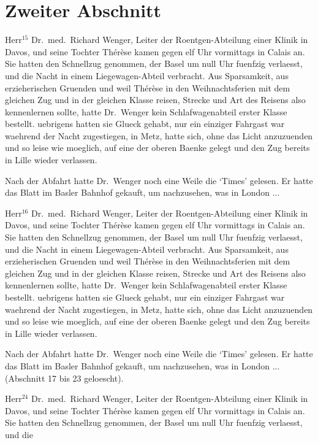 \section{Zweiter Abschnitt}
Herr$^{15}$ Dr.~med.~Richard Wenger, Leiter der Roent\-gen-Ab\-tei\-lung
einer Klinik in Davos, und seine
Tochter Th\'e\-r\`ese kamen gegen elf Uhr vormittags
in Calais an. Sie hatten den Schnellzug genommen,
der Basel um null Uhr fuenfzig verlaesst, und die
Nacht in einem Liege\-wagen-Abteil verbracht.
Aus Sparsamkeit, aus erzieherischen
Gruenden und weil
Th\'e\-r\`ese in den Weihnachtsferien mit dem gleichen
Zug und in der gleichen Klasse reisen, Strecke und
Art des Reisens also kennenlernen sollte, hatte Dr.~Wenger
kein Schlafwagenabteil erster Klasse bestellt.
uebrigens hatten sie Glueck gehabt, nur ein
einziger Fahrgast war waehrend der Nacht zugestiegen,
in Metz, hatte sich, ohne das Licht anzuzuenden
und so leise wie moeglich, auf eine der oberen
Baenke gelegt und den Zug bereits in Lille wieder
verlassen.\par
Nach der Abfahrt hatte Dr.~Wen\-ger noch eine
Weile die `Times' gelesen. Er hatte das Blatt im
Basler Bahnhof gekauft, um nachzusehen, was in London ...\par
Herr$^{16}$ Dr.~med.~Richard Wenger, Leiter der Roent\-gen-Ab\-tei\-lung
einer Klinik in Davos, und seine
Tochter Th\'e\-r\`ese kamen gegen elf Uhr vormittags
in Calais an. Sie hatten den Schnellzug genommen,
der Basel um null Uhr fuenfzig verlaesst, und die
Nacht in einem Liege\-wagen-Abteil verbracht.
Aus Sparsamkeit, aus erzieherischen
Gruenden und weil
Th\'e\-r\`ese in den Weihnachtsferien mit dem gleichen
Zug und in der gleichen Klasse reisen, Strecke und
Art des Reisens also kennenlernen sollte, hatte Dr.~Wenger
kein Schlafwagenabteil erster Klasse bestellt.
uebrigens hatten sie Glueck gehabt, nur ein
einziger Fahrgast war waehrend der Nacht zugestiegen,
in Metz, hatte sich, ohne das Licht anzuzuenden
und so leise wie moeglich, auf eine der oberen
Baenke gelegt und den Zug bereits in Lille wieder
verlassen.\par
Nach der Abfahrt hatte Dr.~Wen\-ger noch eine
Weile die `Times' gelesen. Er hatte das Blatt im
Basler Bahnhof gekauft, um nachzusehen, was in London ...
(Abschnitt 17 bis 23 geloescht).\par
Herr$^{24}$ Dr.~med.~Richard Wenger, Leiter der Roent\-gen-Ab\-tei\-lung
einer Klinik in Davos, und seine
Tochter Th\'e\-r\`ese kamen gegen elf Uhr vormittags
in Calais an. Sie hatten den Schnellzug genommen,
der Basel um null Uhr fuenfzig verlaesst, und die
